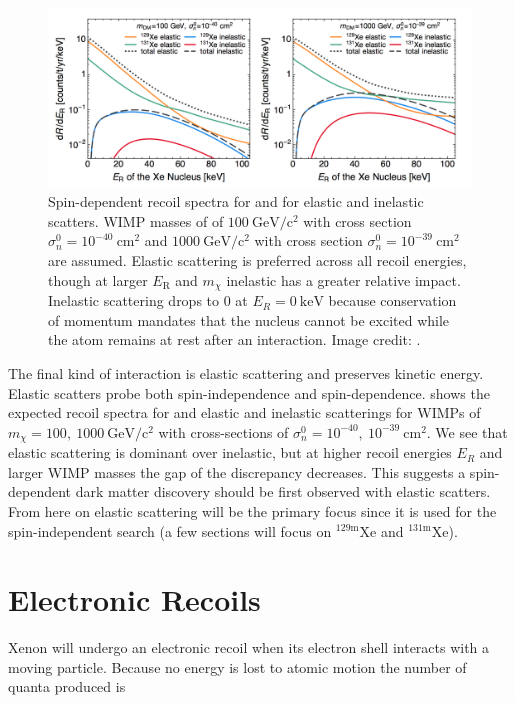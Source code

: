 \begin{figure}
\includegraphics[width=\textwidth]{ElasticInelasticRates}
\caption{Spin-dependent recoil spectra for  and  for elastic and inelastic scatters.  WIMP masses
of of $100\ \mathrm{GeV/c^2}$ with cross section $\sigma_{n}^{0} = 10^{-40}\ \mathrm{cm^{2}}$
and $1000\ \mathrm{GeV/c^2}$ with cross section $\sigma_{n}^{0} = 10^{-39}\ \mathrm{cm^{2}}$ are assumed.  Elastic scattering
is preferred across all recoil energies, though at larger $E_{\mathrm{R}}$ and $m_{\chi}$ inelastic has a greater relative
impact.  Inelastic scattering drops to 0 at 
$E_{R} = 0\ \mathrm{keV}$ because conservation of momentum mandates that the nucleus cannot be excited while the atom remains at rest
after an interaction.  Image credit: .}
\label{fig:nr_elastic_inelastic}
\end{figure}

The final kind of interaction is elastic scattering and preserves kinetic energy.  Elastic scatters probe both spin-independence
and spin-dependence.   shows the expected recoil spectra for  and
 elastic and
inelastic scatterings for WIMPs of $m_{\chi} = 100,\ 1000\ \mathrm{GeV/c^2}$ with cross-sections of
$\sigma_{n}^{0} = 10^{-40},\ 10^{-39}\ \mathrm{cm^{2}}$.  We see that elastic scattering is dominant over inelastic, but at higher recoil
energies $E_{R}$ and larger WIMP masses the gap of the discrepancy decreases.  This suggests a spin-dependent dark matter discovery should
be first observed with elastic scatters.  From here on elastic scattering will be the primary focus since it is used for the
spin-independent search (a few sections will focus on $\mathrm{^{129m}Xe}$ and $\mathrm{^{131m}Xe}$).


\section{Electronic Recoils}
\label{sec:er}
Xenon will undergo an electronic recoil when its electron shell interacts with a moving particle.  Because no energy
is lost to atomic motion the number of quanta produced is

